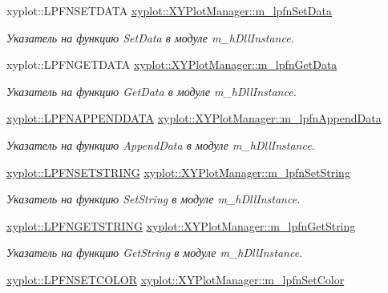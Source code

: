 \begin{DoxyCompactItemize}
xyplot\-::\-L\-P\-F\-N\-S\-E\-T\-D\-A\-T\-A \hyperlink{group__gr_func_pointers_ga12cbf5f4c39f57265eb98fa148e9150a}{xyplot\-::\-X\-Y\-Plot\-Manager\-::m\-\_\-lpfn\-Set\-Data}
\begin{DoxyCompactList}\small\item\em Указатель на функцию Set\-Data в модуле m\-\_\-h\-Dll\-Instance. \end{DoxyCompactList}\item 
xyplot\-::\-L\-P\-F\-N\-G\-E\-T\-D\-A\-T\-A \hyperlink{group__gr_func_pointers_gaf08ccb9c45b77898ac5a5c024b7b6268}{xyplot\-::\-X\-Y\-Plot\-Manager\-::m\-\_\-lpfn\-Get\-Data}
\begin{DoxyCompactList}\small\item\em Указатель на функцию Get\-Data в модуле m\-\_\-h\-Dll\-Instance. \end{DoxyCompactList}\item 
\hyperlink{namespacexyplot_a159121ca25d59ecb75770f0fbeea2515}{xyplot\-::\-L\-P\-F\-N\-A\-P\-P\-E\-N\-D\-D\-A\-T\-A} \hyperlink{group__gr_func_pointers_gab3dfb9dbb2d423d2e6b64fe0d0fcbb8e}{xyplot\-::\-X\-Y\-Plot\-Manager\-::m\-\_\-lpfn\-Append\-Data}
\begin{DoxyCompactList}\small\item\em Указатель на функцию Append\-Data в модуле m\-\_\-h\-Dll\-Instance. \end{DoxyCompactList}\item 
\hyperlink{namespacexyplot_a9bb3deed6ff9723181f09eb590fdf7dd}{xyplot\-::\-L\-P\-F\-N\-S\-E\-T\-S\-T\-R\-I\-N\-G} \hyperlink{group__gr_func_pointers_ga94e766d64a4b9d8d435702a2244540b6}{xyplot\-::\-X\-Y\-Plot\-Manager\-::m\-\_\-lpfn\-Set\-String}
\begin{DoxyCompactList}\small\item\em Указатель на функцию Set\-String в модуле m\-\_\-h\-Dll\-Instance. \end{DoxyCompactList}\item 
\hyperlink{namespacexyplot_ae11ea8cd7e895887b754555f31b0adf3}{xyplot\-::\-L\-P\-F\-N\-G\-E\-T\-S\-T\-R\-I\-N\-G} \hyperlink{group__gr_func_pointers_ga8fdef4b5c9b15682453368367ebb808a}{xyplot\-::\-X\-Y\-Plot\-Manager\-::m\-\_\-lpfn\-Get\-String}
\begin{DoxyCompactList}\small\item\em Указатель на функцию Get\-String в модуле m\-\_\-h\-Dll\-Instance. \end{DoxyCompactList}\item 
\hyperlink{namespacexyplot_ac41175dc795758950c58e18d1660faa5}{xyplot\-::\-L\-P\-F\-N\-S\-E\-T\-C\-O\-L\-O\-R} \hyperlink{group__gr_func_pointers_ga9e25ad5afee76a5ea6402649490afa33}{xyplot\-::\-X\-Y\-Plot\-Manager\-::m\-\_\-lpfn\-Set\-Color}

\end{DoxyCompactItemize}
